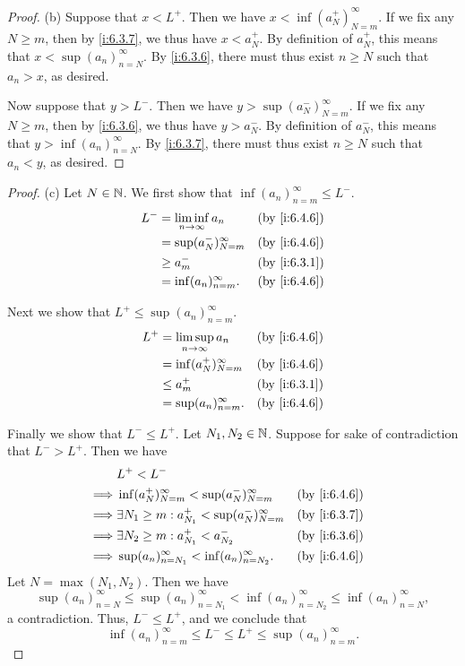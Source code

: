 \begin{proof}{(b)}
  Suppose that \(x < L^+\).
  Then we have \(x < \inf(a_N^+)_{N = m}^\infty\).
  If we fix any \(N \geq m\), then by \cref{i:6.3.7}, we thus have \(x < a_N^+\).
  By definition of \(a_N^+\), this means that \(x < \sup(a_n)_{n = N}^\infty\).
  By \cref{i:6.3.6}, there must thus exist \(n \geq N\) such that \(a_n > x\), as desired.

  Now suppose that \(y > L^-\).
  Then we have \(y > \sup(a_N^-)_{N = m}^\infty\).
  If we fix any \(N \geq m\), then by \cref{i:6.3.6}, we thus have \(y > a_N^-\).
  By definition of \(a_N^-\), this means that \(y > \inf(a_n)_{n = N}^\infty\).
  By \cref{i:6.3.7}, there must thus exist \(n \geq N\) such that \(a_n < y\), as desired.
\end{proof}

\begin{proof}{(c)}
  Let \(N \in \mathbb{N}\).
  We first show that \(\inf(a_n)_{n = m}^\infty \leq L^-\).
  \begin{align*}
    L^- & = \liminf_{n \to \infty} a_n &  & \by{i:6.4.6} \\
        & = \sup(a_N^-)_{N = m}^\infty &  & \by{i:6.4.6} \\
        & \geq a_m^-                   &  & \by{i:6.3.1} \\
        & = \inf(a_n)_{n = m}^\infty.  &  & \by{i:6.4.6}
  \end{align*}

  Next we show that \(L^+ \leq \sup(a_n)_{n = m}^\infty\).
  \begin{align*}
    L^+ & = \limsup_{n \to \infty} a_n &  & \by{i:6.4.6} \\
        & = \inf(a_N^+)_{N = m}^\infty &  & \by{i:6.4.6} \\
        & \leq a_m^+                   &  & \by{i:6.3.1} \\
        & = \sup(a_n)_{n = m}^\infty.  &  & \by{i:6.4.6}
  \end{align*}

  Finally we show that \(L^- \leq L^+\).
  Let \(N_1, N_2 \in \mathbb{N}\).
  Suppose for sake of contradiction that \(L^- > L^+\).
  Then we have
  \begin{align*}
             & L^+ < L^-                                                                     \\
    \implies & \inf(a_N^+)_{N = m}^\infty < \sup(a_N^-)_{N = m}^\infty     &  & \by{i:6.4.6} \\
    \implies & \exists N_1 \geq m : a_{N_1}^+ < \sup(a_N^-)_{N = m}^\infty &  & \by{i:6.3.7} \\
    \implies & \exists N_2 \geq m : a_{N_1}^+ < a_{N_2}^-                  &  & \by{i:6.3.6} \\
    \implies & \sup(a_n)_{n = N_1}^\infty < \inf(a_n)_{n = N_2}^\infty.    &  & \by{i:6.4.6}
  \end{align*}
  Let \(N = \max(N_1, N_2)\).
  Then we have
  \[
    \sup(a_n)_{n = N}^\infty \leq \sup(a_n)_{n = N_1}^\infty < \inf(a_n)_{n = N_2}^\infty \leq \inf(a_n)_{n = N}^\infty,
  \]
  a contradiction.
  Thus, \(L^- \leq L^+\), and we conclude that
  \[
    \inf(a_n)_{n = m}^\infty \leq L^- \leq L^+ \leq \sup(a_n)_{n = m}^\infty.
  \]
\end{proof}

